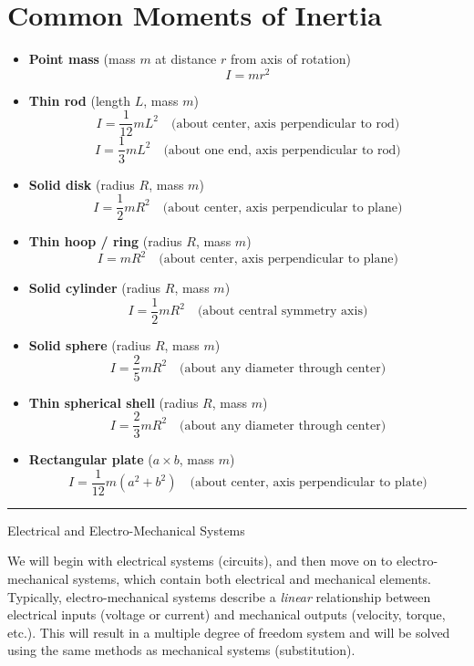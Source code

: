 \documentclass[12pt]{article}
\begin{document}
\section*{Common Moments of Inertia}
\begin{itemize}
\item \textbf{Point mass} (mass $m$ at distance $r$ from axis of rotation)
\[I = mr^2\]

\item \textbf{Thin rod} (length $L$, mass $m$)
\[
I = \frac{1}{12} mL^2 
\quad \text{(about center, axis perpendicular to rod)}
\]
\[
I = \frac{1}{3} mL^2 
\quad \text{(about one end, axis perpendicular to rod)}
\]

\item \textbf{Solid disk} (radius $R$, mass $m$)
\[
I = \frac{1}{2} mR^2 
\quad \text{(about center, axis perpendicular to plane)}
\]

\item \textbf{Thin hoop / ring} (radius $R$, mass $m$)
\[
I = mR^2 
\quad \text{(about center, axis perpendicular to plane)}
\]

\item \textbf{Solid cylinder} (radius $R$, mass $m$)
\[
I = \frac{1}{2} mR^2 
\quad \text{(about central symmetry axis)}
\]

\item \textbf{Solid sphere} (radius $R$, mass $m$)
\[
I = \frac{2}{5} mR^2 
\quad \text{(about any diameter through center)}
\]

\item \textbf{Thin spherical shell} (radius $R$, mass $m$)
\[
I = \frac{2}{3} mR^2 
\quad \text{(about any diameter through center)}
\]

\item \textbf{Rectangular plate} ($a \times b$, mass $m$)
\[
I = \frac{1}{12} m(a^2 + b^2)
\quad \text{(about center, axis perpendicular to plate)}
\]
\end{itemize}
\vspace{1em}
\noindent\hrule
\vspace{1em}
\newpage
\begin{center}
{\LARGE Electrical and Electro-Mechanical Systems\par}
\end{center}
We will begin with electrical systems (circuits), and then move on to electro-mechanical systems, which contain both electrical and mechanical elements. Typically, electro-mechanical systems describe a \textit{linear} relationship between electrical inputs (voltage or current) and mechanical outputs (velocity, torque, etc.). This will result in a multiple degree of freedom system and will be solved using the same methods as mechanical systems (substitution).
\end{document}
